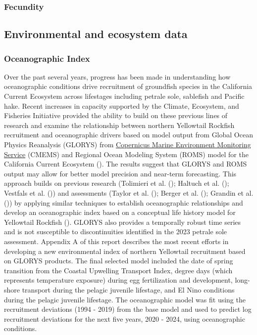 \documentclass[
]{scrartcl}
\begin{document}
\subsubsection{Fecundity}\label{fecundity}

\subsection{Environmental and ecosystem
data}\label{environmental-and-ecosystem-data}

\subsubsection{Oceanographic Index}\label{oceanographic-index}

Over the past several years, progress has been made in understanding how
oceanographic conditions drive recruitment of groundfish species in the
California Current Ecosystem across lifestages including petrale sole,
sablefish and Pacific hake. Recent increases in capacity supported by
the Climate, Ecosystem, and Fisheries Initiative provided the ability to
build on these previous lines of research and examine the relationship
between northern Yellowtail Rockfish recruitment and oceanographic
drivers based on model output from Global Ocean Physics Reanalysis
(GLORYS) from \href{https://marine.copernicus.eu/}{Copernicus Marine
Environment Monitoring Service} (CMEMS) and Regional Ocean Modeling
System (ROMS) model for the California Current Ecosystem
(). The results suggest
that GLORYS and ROMS output may allow for better model precision and
near-term forecasting. This approach builds on previous research
(Tolimieri et al. ();
Haltuch et al. ();
Vestfals et al. ()) and
assessments (Taylor et al. ();
Berger et al. (); Grandin et al.
()) by applying similar
techniques to establish oceanographic relationships and develop an
oceanographic index based on a conceptual life history model for
Yellowtail Rockfish ().
GLORYS also provides a temporally robust time series and is not
susceptible to discontinuities identified in the 2023 petrale sole
assessment. Appendix A of this report describes the most recent efforts
in developing a new environmental index of northern Yellowtail
recruitment based on GLORYS products. The final selected model included
the date of spring transition from the Coastal Upwelling Transport
Index, degree days (which represents temperature exposure) during egg
fertilization and development, long-shore transport during the pelagic
juvenile lifestage, and El Nino conditions during the pelagic juvenile
lifestage. The oceanographic model was fit using the recruitment
deviations (1994 - 2019) from the base model and used to predict log
recruitment deviations for the next five years, 2020 - 2024, using
oceanographic conditions.
\end{document}
